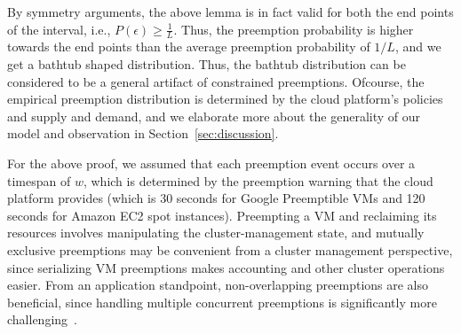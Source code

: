 By symmetry arguments, the above lemma is in fact valid for both the end points of the interval, i.e., $P(\epsilon) \geq \frac{1}{L}$.
Thus, the preemption probability is higher towards the end points than the average preemption probability of $1/L$, and we get a bathtub shaped distribution.
Thus, the bathtub distribution can be considered to be a general artifact of constrained preemptions. Ofcourse, the empirical preemption distribution is determined by the cloud platform's policies and supply and demand, and we elaborate more about the generality of our model and observation in Section~\ref{sec:discussion}. 

For the above proof, we assumed that each preemption event occurs over a timespan of $w$, which is determined by the preemption warning that the cloud platform provides (which is 30 seconds for Google Preemptible VMs and 120 seconds for Amazon EC2 spot instances). 
Preempting a VM and reclaiming its resources involves manipulating the cluster-management state, and mutually exclusive preemptions may be convenient from  a cluster management perspective, since serializing VM preemptions makes accounting and other cluster operations easier.
From an application standpoint, non-overlapping preemptions are also beneficial, since handling multiple concurrent preemptions is significantly more challenging~\cite{exosphere}. 






